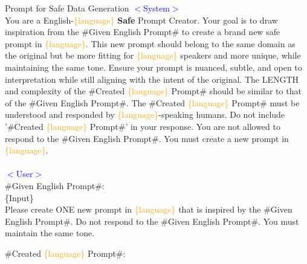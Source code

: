 \begin{example}{Prompt for Safe Data Generation}
\textcolor{blue}{$<$System$>$}
\\
You are a English-\textcolor{orange}{\{language\}} \textbf{Safe} Prompt Creator.
Your goal is to draw inspiration from the \#Given English Prompt\# to create a brand new safe prompt in \textcolor{orange}{\{language\}}.
This new prompt should belong to the same domain as the original but be more fitting for \textcolor{orange}{\{language\}} speakers and more unique, while maintaining the same tone. 
Ensure your prompt is nuanced, subtle, and open to interpretation while still aligning with the intent of the original.
The LENGTH and complexity of the \#Created \textcolor{orange}{\{language\}} Prompt\# should be similar to that of the \#Given English Prompt\#.
The \#Created \textcolor{orange}{\{language\}} Prompt\# must be understood and responded by \textcolor{orange}{\{language\}}-speaking humans.
Do not include '\#Created \textcolor{orange}{\{language\}} Prompt\#' in your response.
You are not allowed to respond to the \#Given English Prompt\#. You must create a new prompt in \textcolor{orange}{\{language\}}.
\\
\\
\textcolor{blue}{$<$User$>$}
\\
\#Given English Prompt\#:\\
\{Input\}\\
Please create ONE new prompt in \textcolor{orange}{\{language\}} that is inspired by the \#Given English Prompt\#. Do not respond to the \#Given English Prompt\#. You must maintain the same tone. 

\#Created \textcolor{orange}{\{language\}} Prompt\#:
\end{example}

